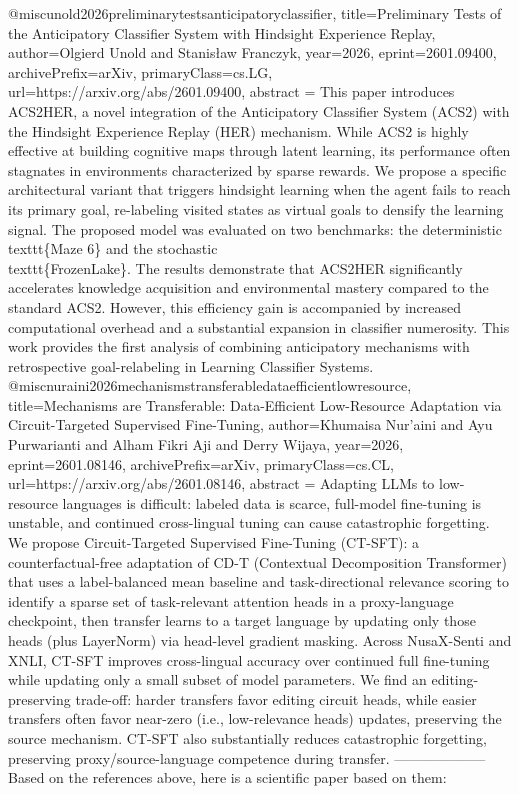 {}@misc{unold2026preliminarytestsanticipatoryclassifier,
      title={Preliminary Tests of the Anticipatory Classifier System with Hindsight Experience Replay}, 
      author={Olgierd Unold and Stanisław Franczyk},
      year={2026},
      eprint={2601.09400},
      archivePrefix={arXiv},
      primaryClass={cs.LG},
      url={https://arxiv.org/abs/2601.09400},
      abstract = {This paper introduces ACS2HER, a novel integration of the Anticipatory Classifier System (ACS2) with the Hindsight Experience Replay (HER) mechanism. While ACS2 is highly effective at building cognitive maps through latent learning, its performance often stagnates in environments characterized by sparse rewards. We propose a specific architectural variant that triggers hindsight learning when the agent fails to reach its primary goal, re-labeling visited states as virtual goals to densify the learning signal. The proposed model was evaluated on two benchmarks: the deterministic \\texttt\{Maze 6\} and the stochastic \\texttt\{FrozenLake\}. The results demonstrate that ACS2HER significantly accelerates knowledge acquisition and environmental mastery compared to the standard ACS2. However, this efficiency gain is accompanied by increased computational overhead and a substantial expansion in classifier numerosity. This work provides the first analysis of combining anticipatory mechanisms with retrospective goal-relabeling in Learning Classifier Systems.}
}@misc{nuraini2026mechanismstransferabledataefficientlowresource,
      title={Mechanisms are Transferable: Data-Efficient Low-Resource Adaptation via Circuit-Targeted Supervised Fine-Tuning}, 
      author={Khumaisa Nur'aini and Ayu Purwarianti and Alham Fikri Aji and Derry Wijaya},
      year={2026},
      eprint={2601.08146},
      archivePrefix={arXiv},
      primaryClass={cs.CL},
      url={https://arxiv.org/abs/2601.08146},
      abstract = {Adapting LLMs to low-resource languages is difficult: labeled data is scarce, full-model fine-tuning is unstable, and continued cross-lingual tuning can cause catastrophic forgetting. We propose Circuit-Targeted Supervised Fine-Tuning (CT-SFT): a counterfactual-free adaptation of CD-T (Contextual Decomposition Transformer) that uses a label-balanced mean baseline and task-directional relevance scoring to identify a sparse set of task-relevant attention heads in a proxy-language checkpoint, then transfer learns to a target language by updating only those heads (plus LayerNorm) via head-level gradient masking. Across NusaX-Senti and XNLI, CT-SFT improves cross-lingual accuracy over continued full fine-tuning while updating only a small subset of model parameters. We find an editing-preserving trade-off: harder transfers favor editing circuit heads, while easier transfers often favor near-zero (i.e., low-relevance heads) updates, preserving the source mechanism. CT-SFT also substantially reduces catastrophic forgetting, preserving proxy/source-language competence during transfer.}
}
        --------------------
         Based on the references above, here is a scientific paper based on them:

